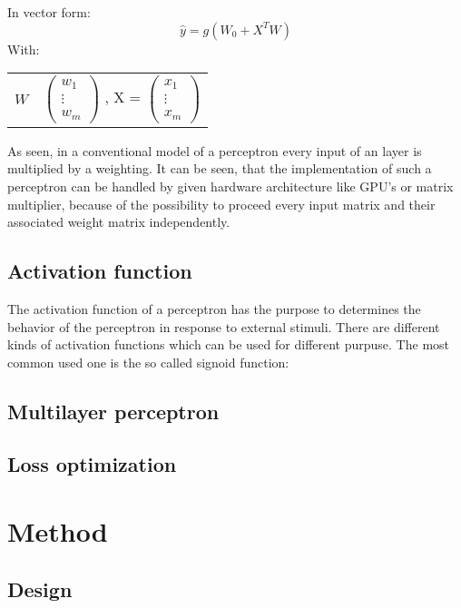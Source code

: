 \documentclass{report}
\makeatletter
\numberwithin{equation}{section}
\newenvironment{conditions}
{\par\vspace{\abovedisplayskip}
\noindent\begin{tabular}{>{$}l<{$} @{${}={}$} l}}
        {\end{tabular}\par\vspace{\belowdisplayskip}}
\makeatother
\begin{document}
In vector form:
\begin{equation}
    \hat y = g(W_0 + X^TW)
\end{equation}
With:
\begin{conditions}
    W & $\begin{pmatrix} w_1 \\ \vdots \\ w_m \end{pmatrix}$ , X = $\begin{pmatrix} x_1 \\ \vdots \\ x_m \end{pmatrix}$
\end{conditions}
As seen, in a conventional model of a perceptron every input of an
layer is multiplied by a weighting. It can be seen, that the implementation
of such a perceptron can be handled by given hardware architecture like GPU's
or matrix multiplier, because of the possibility to proceed every input matrix
and their associated weight matrix independently.

\section{Activation function}
The activation function of a perceptron has the purpose to determines the
behavior of the perceptron in response to external stimuli. There are different
kinds of activation functions which can be used for different purpuse. The most
common used one is the so called signoid function:

\section{Multilayer perceptron}

\section{Loss optimization}

\chapter{Method}

\section{Design}
\end{document}
